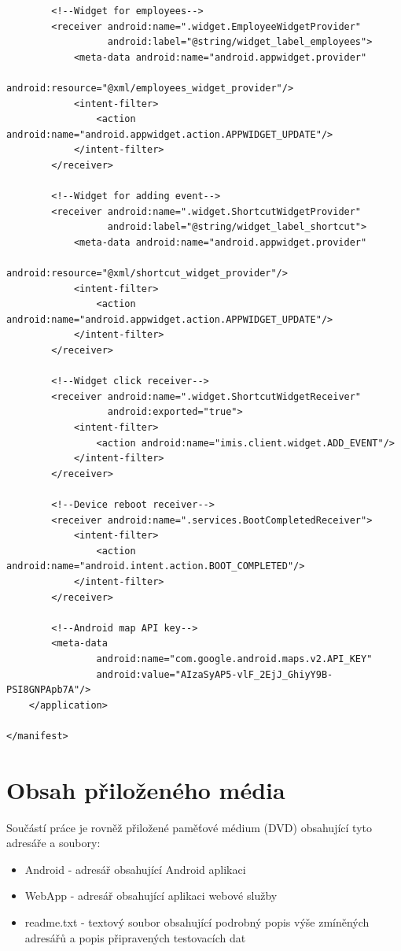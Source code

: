 \documentclass{diplomka}
\begin{document}
\begin{lstlisting}
        <!--Widget for employees-->
        <receiver android:name=".widget.EmployeeWidgetProvider"
                  android:label="@string/widget_label_employees">
            <meta-data android:name="android.appwidget.provider"
                       android:resource="@xml/employees_widget_provider"/>
            <intent-filter>
                <action android:name="android.appwidget.action.APPWIDGET_UPDATE"/>
            </intent-filter>
        </receiver>

        <!--Widget for adding event-->
        <receiver android:name=".widget.ShortcutWidgetProvider"
                  android:label="@string/widget_label_shortcut">
            <meta-data android:name="android.appwidget.provider"
                       android:resource="@xml/shortcut_widget_provider"/>
            <intent-filter>
                <action android:name="android.appwidget.action.APPWIDGET_UPDATE"/>
            </intent-filter>
        </receiver>

        <!--Widget click receiver-->
        <receiver android:name=".widget.ShortcutWidgetReceiver"
                  android:exported="true">
            <intent-filter>
                <action android:name="imis.client.widget.ADD_EVENT"/>
            </intent-filter>
        </receiver>

        <!--Device reboot receiver-->
        <receiver android:name=".services.BootCompletedReceiver">
            <intent-filter>
                <action android:name="android.intent.action.BOOT_COMPLETED"/>
            </intent-filter>
        </receiver>

        <!--Android map API key-->
        <meta-data
                android:name="com.google.android.maps.v2.API_KEY"
                android:value="AIzaSyAP5-vlF_2EjJ_GhiyY9B-PSI8GNPApb7A"/>
    </application>

</manifest>
\end{lstlisting}

\chapter{Obsah přiloženého média}
Součástí práce je rovněž přiložené paměťové médium (DVD) obsahující tyto adresáře a soubory:
\begin{itemize}
\item Android - adresář obsahující Android aplikaci
\item WebApp - adresář obsahující aplikaci webové služby
\item readme.txt - textový soubor obsahující podrobný popis výše zmíněných adresářů a popis připravených testovacích dat
\end{itemize}
\end{document}
